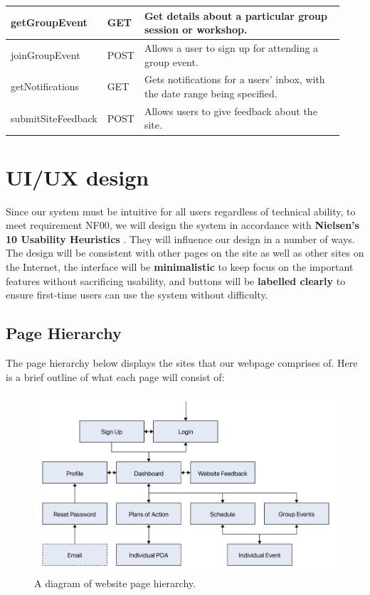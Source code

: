 \documentclass[10pt]{article}
\begin{document}
\begin{longtable}{|p{0.2\linewidth}|p{0.08\linewidth}|p{0.65\linewidth}|}
    getGroupEvent
    &
    GET
    &
    Get details about a particular group session or workshop.
    \\ \hline

    joinGroupEvent
    &
    POST
    &
    Allows a user to sign up for attending a group event.
    \\ \hline

    getNotifications
    &
    GET
    &
    Gets notifications for a users' inbox, with the date range being specified.
    \\ \hline

    submitSiteFeedback
    &
    POST
    &
    Allows users to give feedback about the site.
    \\ \hline



\end{longtable}




\section{UI/UX design}

Since our system must be intuitive for all users regardless of technical
ability, to meet requirement NF00, we will design the system in accordance with
\textbf{Nielsen's 10 Usability Heuristics} \cite{nielsen}. They will influence
our design in a number of ways. The design will be consistent with other pages
on the site as well as other sites on the Internet, the interface will be
\textbf{minimalistic} to keep focus on the important features without sacrificing
usability, and buttons will be \textbf{labelled clearly} to ensure first-time users can
use the system without difficulty.

\subsection{Page Hierarchy}
The page hierarchy below displays the sites that our webpage comprises of. Here
is a brief outline of what each page will consist of:

\begin{figure}[H]
    \centering
    \includegraphics[width=0.55 \textwidth]{Hierarchy}
    \caption{A diagram of website page hierarchy.}
    \label{fig:website_page_hierarchy}
\end{figure}
\end{document}
